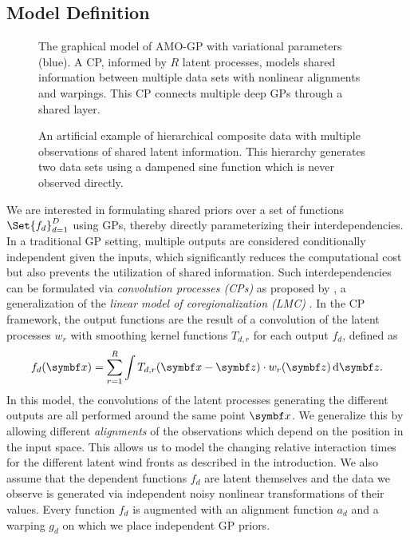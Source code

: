 \subsection{Model Definition}
\label{sub:timeseries_alignment:model}
\begin{figure}[t]
    \centering
    
    \caption{
        \label{fig:timeseries_alignment:graphical_model_supervised}
        The graphical model of AMO-GP with variational parameters (blue).
        A CP, informed by $R$ latent processes, models shared information between multiple data sets with nonlinear alignments and warpings.
        This CP connects multiple deep GPs through a shared layer.
    }
\end{figure}
\begin{figure}[t]
    \centering
    \caption{
        \label{fig:timeseries_alignment:dampened_sine_decomposition}
        An artificial example of hierarchical composite data with multiple observations of shared latent information.
        This hierarchy generates two data sets using a dampened sine function which is never observed directly.
    }
\end{figure}
We are interested in formulating shared priors over a set of functions $\Set{f_d}_{d=1}^D$ using GPs, thereby directly parameterizing their interdependencies.
In a traditional GP setting, multiple outputs are considered conditionally independent given the inputs, which significantly reduces the computational cost but also prevents the utilization of shared information.
Such interdependencies can be formulated via \emph{convolution processes (CPs)} as proposed by \textcite{boyle_dependent_2004}, a generalization of the \emph{linear model of coregionalization (LMC)} \parencite{journel_mining_1978,coburn_geostatistics_2000}.
In the CP framework, the output functions are the result of a convolution of the latent processes $w_r$ with smoothing kernel functions $T_{d,r}$ for each output $f_d$, defined as
\begin{align}
    f_d(\mat{x}) = \sum_{r=1}^R \int T_{d,r}(\mat{x} - \mat{z}) \cdot w_r(\mat{z}) \diff \mat{z}.
\end{align}
In this model, the convolutions of the latent processes generating the different outputs are all performed around the same point $\mat{x}$.
We generalize this by allowing different \emph{alignments} of the observations which depend on the position in the input space.
This allows us to model the changing relative interaction times for the different latent wind fronts as described in the introduction.
We also assume that the dependent functions $f_d$ are latent themselves and the data we observe is generated via independent noisy nonlinear transformations of their values.
Every function $f_d$ is augmented with an alignment function $a_d$ and a warping $g_d$ on which we place independent GP priors.

